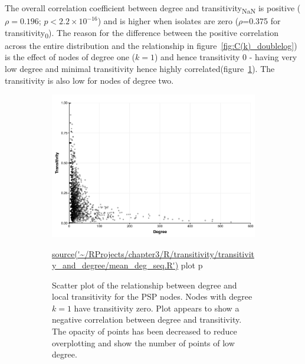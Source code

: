 The overall correlation coefficient between degree and transitivity\textsubscript{NaN} is positive ($\rho= 0.196$; $p < 2.2 \times 10^{-16}$) and is higher when isolates are zero ($\rho$=0.375 for transitivity\textsubscript{0}). The reason for the difference between the positive correlation across the entire distribution and the relationship in figure~\ref{fig:C(k)_doublelog}) is the effect of nodes of degree one ($k=1$) and hence transitivity 0 - having very low degree and minimal transitivity hence highly correlated(figure~\ref{fig:Scatter plot of the relationship between degree and local transitivity for the PSP nodes}). The transitivity is also low for nodes of degree two.


\begin{figure}
    \centering
    \begin{subfigure}[t]{0.45\textwidth}
        \centering
        \includegraphics[width=\textwidth]{images/chapter3/ggplot2/degree_and_transitivity/Rplot_scatterplot_c_and_degree_new_format.png}
\caption{Scatter plot of the relationship between degree and local transitivity for the PSP nodes. Nodes with degree $k=1$ have transitivity zero. Plot appears to show a negative correlation between degree and transitivity. The opacity of points has been decreased to reduce overplotting and show the number of points of low degree. }
 \tiny\url{source('~/RProjects/chapter3/R/transitivity/transitivity_and_degree/mean_deg_seq.R')} plot p
    \label{fig:Scatter plot of the relationship between degree and local transitivity for the PSP nodes}
    \end{subfigure}
    \hfill
    \begin{subfigure}[t]{0.45\textwidth}

\end{subfigure}
\end{figure}
